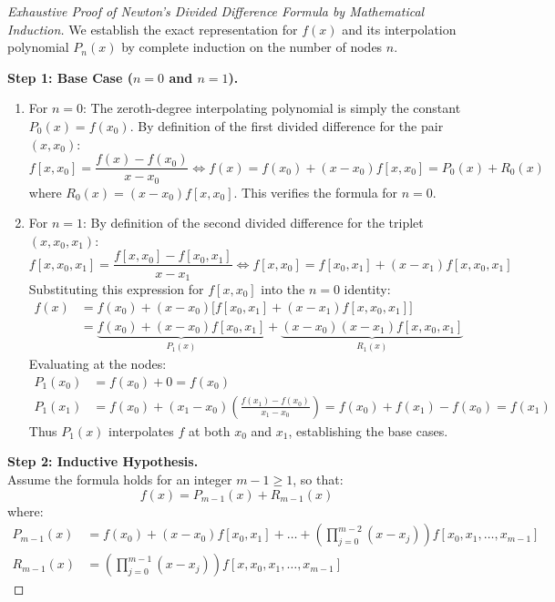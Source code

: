 \begin{proof}[Exhaustive Proof of Newton's Divided Difference Formula by Mathematical Induction]
We establish the exact representation for $f(x)$ and its interpolation polynomial $P_n(x)$ by complete induction on the number of nodes $n$.

\medskip
\noindent\textbf{Step 1: Base Case ($n = 0$ and $n = 1$).} \\
\begin{enumerate}
    \item For $n = 0$: The zeroth-degree interpolating polynomial is simply the constant $P_0(x) = f(x_0)$.
    By definition of the first divided difference for the pair $(x, x_0)$:
    \begin{equation}
        f[x, x_0] = \frac{f(x) - f(x_0)}{x - x_0} \iff f(x) = f(x_0) + (x - x_0) f[x, x_0] = P_0(x) + R_0(x)
    \end{equation}
    where $R_0(x) = (x - x_0) f[x, x_0]$. This verifies the formula for $n = 0$.
    
    \item For $n = 1$: By definition of the second divided difference for the triplet $(x, x_0, x_1)$:
    \begin{equation}
        f[x, x_0, x_1] = \frac{f[x, x_0] - f[x_0, x_1]}{x - x_1} \iff f[x, x_0] = f[x_0, x_1] + (x - x_1) f[x, x_0, x_1]
    \end{equation}
    Substituting this expression for $f[x, x_0]$ into the $n = 0$ identity:
    \begin{align}
        f(x) &= f(x_0) + (x - x_0) \Big[ f[x_0, x_1] + (x - x_1) f[x, x_0, x_1] \Big] \nonumber \\
        &= \underbrace{f(x_0) + (x - x_0) f[x_0, x_1]}_{P_1(x)} + \underbrace{(x - x_0)(x - x_1) f[x, x_0, x_1]}_{R_1(x)}
    \end{align}
    Evaluating at the nodes:
    \begin{align}
        P_1(x_0) &= f(x_0) + 0 = f(x_0) \\
        P_1(x_1) &= f(x_0) + (x_1 - x_0) \left( \frac{f(x_1) - f(x_0)}{x_1 - x_0} \right) = f(x_0) + f(x_1) - f(x_0) = f(x_1)
    \end{align}
    Thus $P_1(x)$ interpolates $f$ at both $x_0$ and $x_1$, establishing the base cases.
\end{enumerate}

\medskip
\noindent\textbf{Step 2: Inductive Hypothesis.} \\
Assume the formula holds for an integer $m - 1 \ge 1$, so that:
\begin{equation}
    f(x) = P_{m-1}(x) + R_{m-1}(x)
\end{equation}
where:
\begin{align}
    P_{m-1}(x) &= f(x_0) + (x - x_0)f[x_0, x_1] + \dots + \left(\prod_{j=0}^{m-2}(x - x_j)\right) f[x_0, x_1, \dots, x_{m-1}] \\
    R_{m-1}(x) &= \left( \prod_{j=0}^{m-1} (x - x_j) \right) f[x, x_0, x_1, \dots, x_{m-1}]
\end{align}


\end{proof}
